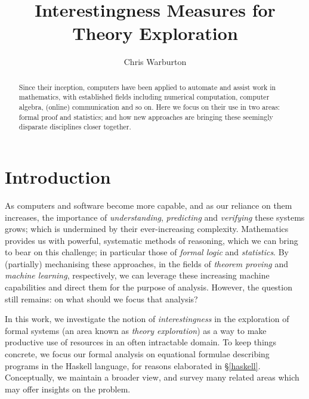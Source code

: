 \documentclass[]{article}
\begin{document}
\pagestyle{headings}  %

\title{Interestingness Measures for Theory Exploration}

\author{Chris Warburton}


\maketitle              %

\begin{abstract}
Since their inception, computers have been applied to automate and assist work in mathematics, with established fields including numerical computation, computer algebra, (online) communication and so on. Here we focus on their use in two areas: formal proof and statistics; and how new approaches are bringing these seemingly disparate disciplines closer together.
\end{abstract}

\section{Introduction}

As computers and software become more capable, and as our reliance on them increases, the importance of \emph{understanding}, \emph{predicting} and \emph{verifying} these systems grows; which is undermined by their ever-increasing complexity. Mathematics provides us with powerful, systematic methods of reasoning, which we can bring to bear on this challenge; in particular those of \emph{formal logic} and \emph{statistics}. By (partially) mechanising these approaches, in the fields of \emph{theorem proving} and \emph{machine learning}, respectively, we can leverage these increasing machine capabilities and direct them for the purpose of analysis. However, the question still remains: on what should we focus that analysis?

In this work, we investigate the notion of \emph{interestingness} in the exploration of formal systems (an area known as \emph{theory exploration}) as a way to make productive use of resources in an often intractable domain. To keep things concrete, we focus our formal analysis on equational formulae describing programs in the Haskell language, for reasons elaborated in \S \ref{haskell}. Conceptually, we maintain a broader view, and survey many related areas which may offer insights on the problem.
\end{document}
